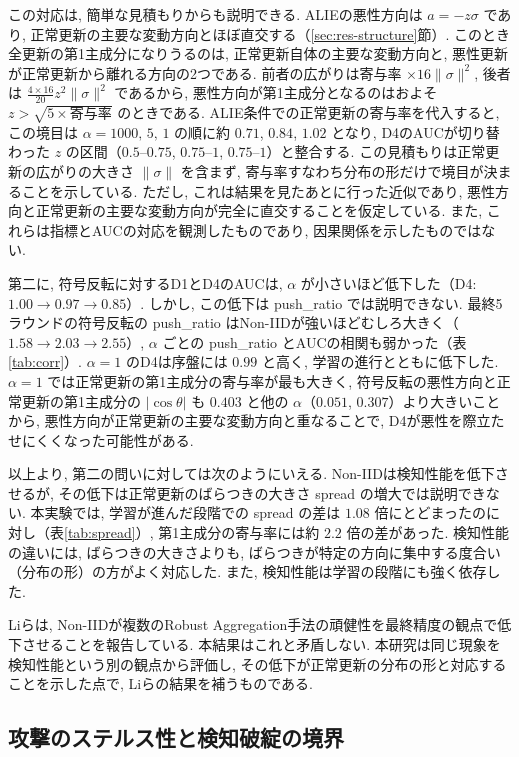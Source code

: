 \documentclass[a4j, twocolumn, dvipdfmx]{jsarticle}
\newcommand{\PushRatio}{\textrm{push\_ratio}}
\newcommand{\Spread}{\textrm{spread}}
\begin{document}
この対応は, 簡単な見積もりからも説明できる. ALIEの悪性方向は $a=-z\sigma$ であり, 正常更新の主要な変動方向とほぼ直交する（\ref{sec:res-structure}節）. このとき全更新の第1主成分になりうるのは, 正常更新自体の主要な変動方向と, 悪性更新が正常更新から離れる方向の2つである. 前者の広がりは寄与率 $\times 16\|\sigma\|^2$, 後者は $\frac{4 \times 16}{20} z^2\|\sigma\|^2$ であるから, 悪性方向が第1主成分となるのはおよそ $z > \sqrt{5 \times \text{寄与率}}$ のときである. ALIE条件での正常更新の寄与率を代入すると, この境目は $\alpha=1000,\,5,\,1$ の順に約 $0.71$, $0.84$, $1.02$ となり, D4のAUCが切り替わった $z$ の区間（$0.5$--$0.75$, $0.75$--$1$, $0.75$--$1$）と整合する. この見積もりは正常更新の広がりの大きさ $\|\sigma\|$ を含まず, 寄与率すなわち分布の形だけで境目が決まることを示している. ただし, これは結果を見たあとに行った近似であり, 悪性方向と正常更新の主要な変動方向が完全に直交することを仮定している. また, これらは指標とAUCの対応を観測したものであり, 因果関係を示したものではない.

第二に, 符号反転に対するD1とD4のAUCは, $\alpha$ が小さいほど低下した（D4: $1.00 \to 0.97 \to 0.85$）. しかし, この低下は \PushRatio{} では説明できない. 最終5ラウンドの符号反転の \PushRatio{} はNon-IIDが強いほどむしろ大きく（$1.58 \to 2.03 \to 2.55$）, $\alpha$ ごとの \PushRatio{} とAUCの相関も弱かった（表\ref{tab:corr}）. $\alpha=1$ のD4は序盤には $0.99$ と高く, 学習の進行とともに低下した. $\alpha=1$ では正常更新の第1主成分の寄与率が最も大きく, 符号反転の悪性方向と正常更新の第1主成分の $|\cos\theta|$ も $0.403$ と他の $\alpha$（$0.051$, $0.307$）より大きいことから, 悪性方向が正常更新の主要な変動方向と重なることで, D4が悪性を際立たせにくくなった可能性がある.

以上より, 第二の問いに対しては次のようにいえる. Non-IIDは検知性能を低下させるが, その低下は正常更新のばらつきの大きさ \Spread{} の増大では説明できない. 本実験では, 学習が進んだ段階での \Spread{} の差は $1.08$ 倍にとどまったのに対し（表\ref{tab:spread}）, 第1主成分の寄与率には約 $2.2$ 倍の差があった. 検知性能の違いには, ばらつきの大きさよりも, ばらつきが特定の方向に集中する度合い（分布の形）の方がよく対応した. また, 検知性能は学習の段階にも強く依存した.

Liら\cite{li2023experimental}は, Non-IIDが複数のRobust Aggregation手法の頑健性を最終精度の観点で低下させることを報告している. 本結果はこれと矛盾しない. 本研究は同じ現象を検知性能という別の観点から評価し, その低下が正常更新の分布の形と対応することを示した点で, Liらの結果を補うものである.

\subsection{攻撃のステルス性と検知破綻の境界}
\label{sec:disc-rq3}
\end{document}
